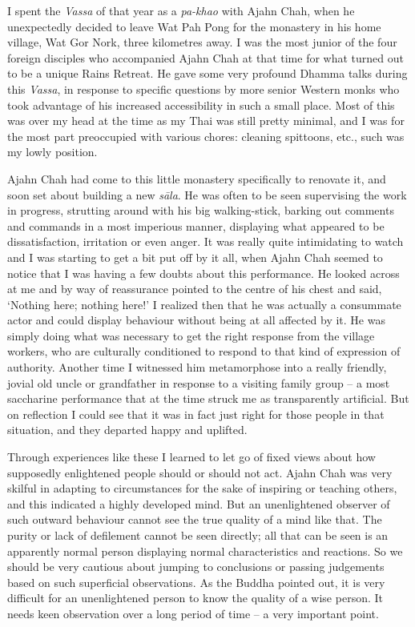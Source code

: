 I spent the \emph{Vassa} of that year as a \emph{pa-khao} with Ajahn
Chah, when he unexpectedly decided to leave Wat Pah Pong for the
monastery in his home village, Wat Gor Nork, three kilometres away. I
was the most junior of the four foreign disciples who accompanied Ajahn
Chah at that time for what turned out to be a unique Rains Retreat. He
gave some very profound Dhamma talks during this \emph{Vassa}, in
response to specific questions by more senior Western monks who took
advantage of his increased accessibility in such a small place. Most of
this was over my head at the time as my Thai was still pretty minimal, 
and I was for the most part preoccupied with various chores: cleaning
spittoons, etc., such was my lowly position.

Ajahn Chah had come to this little monastery specifically to renovate
it, and soon set about building a new \emph{sāla}. He was often to be
seen supervising the work in progress, strutting around with his big
walking-stick, barking out comments and commands in a most imperious
manner, displaying what appeared to be dissatisfaction, irritation or
even anger. It was really quite intimidating to watch and I was starting
to get a bit put off by it all, when Ajahn Chah seemed to notice that I
was having a few doubts about this performance. He looked across at me
and by way of reassurance pointed to the centre of his chest and said, 
`Nothing here; nothing here!' I realized then that he was actually a
consummate actor and could display behaviour without being at all
affected by it. He was simply doing what was necessary to get the right
response from the village workers, who are culturally conditioned to
respond to that kind of expression of authority. Another time I
witnessed him metamorphose into a really friendly, jovial old uncle or
grandfather in response to a visiting family group -- a most saccharine
performance that at the time struck me as transparently artificial. But
on reflection I could see that it was in fact just right for those
people in that situation, and they departed happy and uplifted.

Through experiences like these I learned to let go of fixed views about
how supposedly enlightened people should or should not act. Ajahn Chah
was very skilful in adapting to circumstances for the sake of inspiring
or teaching others, and this indicated a highly developed mind. But an
unenlightened observer of such outward behaviour cannot see the true
quality of a mind like that. The purity or lack of defilement cannot be
seen directly; all that can be seen is an apparently normal person
displaying normal characteristics and reactions. So we should be very
cautious about jumping to conclusions or passing judgements based on
such superficial observations. As the Buddha pointed out, it is very
difficult for an unenlightened person to know the quality of a wise
person. It needs keen observation over a long period of time -- a very
important point.


